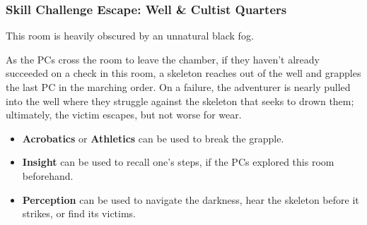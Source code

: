 \subsubsection*{Skill Challenge Escape: Well \& Cultist Quarters}
\label{sec:SC_WellAndCultistQuarters}
\begin{readout}
  This room is heavily obscured by an unnatural black fog.
\end{readout}
As the PCs cross the room to leave the chamber, if they haven't already succeeded on a check in this room, a
skeleton reaches out of the well and grapples the last PC in the marching order. On a failure, the adventurer
is nearly pulled into the well where they struggle against the skeleton that seeks to drown them; ultimately,
the victim escapes, but not worse for wear.
\begin{skillChallenge}
  \begin{itemize}
    \item \textbf{Acrobatics} or \textbf{Athletics} can be used to break the grapple. \easyDC
    \item \textbf{Insight} can be used to recall one's steps, if the PCs explored this room beforehand. \easyDC
    \item \textbf{Perception} can be used to navigate the darkness, hear the skeleton before it strikes, or
    find its victims. \moderateDC
  \end{itemize}
\end{skillChallenge}


\pagebreak
